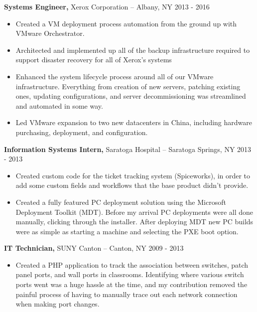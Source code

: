 \documentclass[11pt]{article}       %
\begin{document}
\textbf{Systems Engineer,} {Xerox Corporation} -- Albany, NY \hfill 2013 - 2016 \\
\vspace{-9pt}
\begin{itemize}
  
  \item Created a VM deployment process automation from the ground up with VMware Orchestrator.
  
  \item Architected and implemented up all of the backup infrastructure required to support disaster recovery for all of Xerox's systems
  
  \item Enhanced the system lifecycle process around all of our VMware infrastructure. Everything from creation of new servers, patching existing ones, updating configurations, and server decommissioning was streamlined and automated in some way.
  
  \item Led VMware expansion to two new datacenters in China, including hardware purchasing, deployment, and configuration.
  
\end{itemize}

\textbf{Information Systems Intern,} {Saratoga Hospital} -- Saratoga Springs, NY \hfill 2013 - 2013 \\
\vspace{-9pt}
\begin{itemize}
  
  \item Created custom code for the ticket tracking system (Spiceworks), in order to add some custom fields and workflows that the base product didn't provide.
  
  \item Created a fully featured PC deployment solution using the Microsoft Deployment Toolkit (MDT). Before my arrival PC deployments were all done manually, clicking through the installer. After deploying MDT new PC builds were as simple as starting a machine and selecting the PXE boot option.
  
\end{itemize}

\textbf{IT Technician,} {SUNY Canton} -- Canton, NY \hfill 2009 - 2013 \\
\vspace{-9pt}
\begin{itemize}
  
  \item Created a PHP application to track the association between switches, patch panel ports, and wall ports in classrooms. Identifying where various switch ports went was a huge hassle at the time, and my contribution removed the painful process of having to manually trace out each network connection when making port changes.
  
\end{itemize}
\end{document}

